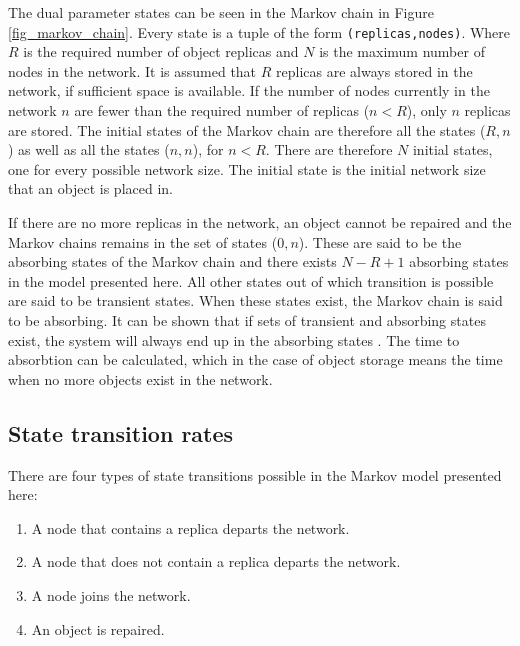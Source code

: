 \documentclass[10pt,a4paper,conference]{IEEEtran}
\begin{document}

The dual parameter states can be seen in the Markov chain in Figure \ref{fig_markov_chain}. Every state is a tuple of the form \verb.(replicas,nodes).. Where $R$ is the required number of object replicas and $N$ is the maximum number of nodes in the network. It is assumed that $R$ replicas are always stored in the network, if sufficient space is available. If the number of nodes currently in the network $n$ are fewer than the required number of replicas ($n < R$), only $n$ replicas are stored. The initial states of the Markov chain are therefore all the states ($R,n$) as well as all the states ($n,n$), for $n < R$. There are therefore $N$ initial states, one for every possible network size. The initial state is the initial network size that an object is placed in.

If there are no more replicas in the network, an object cannot be repaired and the Markov chains remains in the set of states ($0,n$). These are said to be the absorbing states of the Markov chain and there exists $N - R + 1$ absorbing states in the model presented here. All other states out of which transition is possible are said to be transient states. When these states exist, the Markov chain is said to be absorbing. It can be shown that if sets of transient and absorbing states exist, the system will always end up in the absorbing states \cite{grinstead1997introduction_probability}. The time to absorbtion can be calculated, which in the case of object storage means the time when no more objects exist in the network.

\subsection{State transition rates}

There are four types of state transitions possible in the Markov model presented here:
%
\begin{enumerate}
\item A node that contains a replica departs the network.
\item A node that does not contain a replica departs the network.
\item A node joins the network.
\item An object is repaired.
\end{enumerate}

\end{document}
